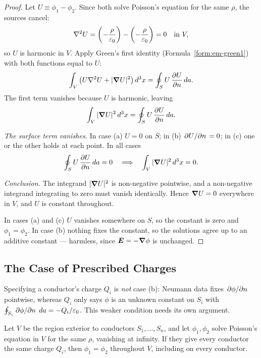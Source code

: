 \begin{proof}
Let $U \equiv \phi_1 - \phi_2$. Since both solve Poisson's equation for the same $\rho$, the sources cancel:
\[
    \laplacian U = \left(-\frac{\rho}{\varepsilon_0}\right) - \left(-\frac{\rho}{\varepsilon_0}\right) = 0 \quad\text{in } V,
\]
so $U$ is harmonic in $V$. Apply Green's first identity (Formula~\ref{form:em-green1}) with both functions equal to $U$:
\[
    \int_V \left(U\laplacian U + |\grad U|^2\right) d^3x = \oint_S U\,\pdv{U}{n}\,da .
\]
The first term vanishes because $U$ is harmonic, leaving
\[
    \int_V |\grad U|^2\,d^3x = \oint_S U\,\pdv{U}{n}\,da .
\]

\emph{The surface term vanishes.} In case (a) $U=0$ on $S$; in (b) $\pdv*{U}{n}=0$; in (c) one or the other holds at each point. In all cases
\[
    \oint_S U\,\pdv{U}{n}\,da = 0 \quad\Longrightarrow\quad \int_V |\grad U|^2\,d^3x = 0 .
\]

\emph{Conclusion.} The integrand $|\grad U|^2$ is non-negative pointwise, and a non-negative integrand integrating to zero must vanish identically. Hence $\grad U = 0$ everywhere in $V$, and $U$ is constant throughout.

In cases (a) and (c) $U$ vanishes somewhere on $S$, so the constant is zero and $\phi_1=\phi_2$. In case (b) nothing fixes the constant, so the solutions agree up to an additive constant --- harmless, since $\vect{E}=-\grad\phi$ is unchanged.
\end{proof}

\subsection{The Case of Prescribed Charges}

Specifying a conductor's charge $Q_i$ is \emph{not} case (b): Neumann data fixes $\pdv*{\phi}{n}$ pointwise, whereas $Q_i$ only says $\phi$ is an unknown constant on $S_i$ with $\oint_{S_i}\pdv*{\phi}{n}\,da = -Q_i/\varepsilon_0$. This weaker condition needs its own argument.

\begin{theorem}
\label{thm:em-uniqueness-charges}
Let $V$ be the region exterior to conductors $S_1,\dots,S_n$, and let $\phi_1,\phi_2$ solve Poisson's equation in $V$ for the same $\rho$, vanishing at infinity. If they give every conductor the same charge $Q_i$, then $\phi_1=\phi_2$ throughout $V$, including on every conductor.
\end{theorem}

